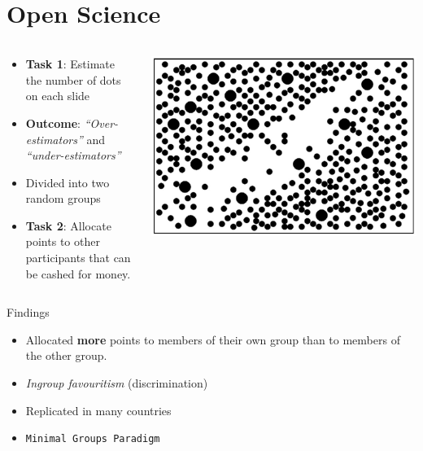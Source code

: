 \documentclass[
  ignorenonframetext,
  aspectratio=169,
]{beamer}
\providecommand{\tightlist}{%
  \setlength{\itemsep}{0pt}\setlength{\parskip}{0pt}}\usepackage{longtable,booktabs,array}
\begin{document}
\section{Open Science}\label{open-science}

\begin{frame}{}
\label{section-2}
\begin{columns}[c,totalwidth=8em]
\begin{column}{0.4\textwidth}
\begin{itemize}[<+->]
\tightlist
\item
  \textbf{Task 1}: Estimate the number of dots on each slide
\item
  \textbf{Outcome}: \emph{``Over-estimators''} and
  \emph{``under-estimators''}
\item
  Divided into two random groups
\item
  \textbf{Task 2}: Allocate points to other participants that can be
  cashed for money.
\end{itemize}
\end{column}

\begin{column}{0.6\textwidth}
\includegraphics{figs/tajfel.png}
\end{column}
\end{columns}
\end{frame}

\begin{frame}[fragile]{Findings}
\label{findings}
\begin{itemize}[<+->]
\tightlist
\item
  Allocated \textbf{more} points to members of their own group than to
  members of the other group.
\item
  \emph{Ingroup favouritism} (discrimination)
\item
  Replicated in many countries
\item
  \texttt{Minimal\ Groups\ Paradigm}
\end{itemize}
\end{frame}
\end{document}
